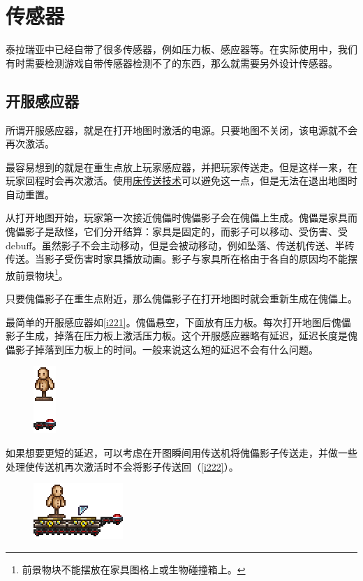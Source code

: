 \section{传感器}
泰拉瑞亚中已经自带了很多传感器，例如压力板、感应器等。在实际使用中，我们有时需要检测游戏自带传感器检测不了的东西，那么就需要另外设计传感器。

\subsection{开服感应器}
所谓开服感应器，就是在打开地图时激活的电源。只要地图不关闭，该电源就不会再次激活。

最容易想到的就是在重生点放上玩家感应器，并把玩家传送走。但是这样一来，在玩家回程时会再次激活。使用\href{https://v.youku.com/v_show/id_XMTg0NzYxNDg0OA}{床传送技术}可以避免这一点，但是无法在退出地图时自动重置。

从打开地图开始，玩家第一次接近傀儡时傀儡影子会在傀儡上生成。傀儡是家具而傀儡影子是敌怪，它们分开结算：家具是固定的，而影子可以移动、受伤害、受debuff。虽然影子不会主动移动，但是会被动移动，例如坠落、传送机传送、半砖传送。当影子受伤害时家具播放动画。影子与家具所在格由于各自的原因均不能摆放前景物块\footnote{前景物块不能摆放在家具图格上或生物碰撞箱上。}。

只要傀儡影子在重生点附近，那么傀儡影子在打开地图时就会重新生成在傀儡上。

最简单的开服感应器如\autoref{i221}。傀儡悬空，下面放有压力板。每次打开地图后傀儡影子生成，掉落在压力板上激活压力板。这个开服感应器略有延迟，延迟长度是傀儡影子掉落到压力板上的时间。一般来说这么短的延迟不会有什么问题。

\begin{figure}[!ht]
\centering
\includegraphics{images/221.png}
\caption{}
\label{i221}
\end{figure}

如果想要更短的延迟，可以考虑在开图瞬间用传送机将傀儡影子传送走，并做一些处理使传送机再次激活时不会将影子传送回（\autoref{i222}）。

\begin{figure}[!ht]
\centering
\includegraphics{images/222.png}
\caption{}
\label{i222}
\end{figure}

